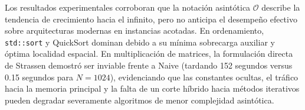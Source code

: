 Los resultados experimentales corroboran que la notación asintótica $\mathcal{O}$ describe la tendencia de crecimiento hacia el infinito, pero no anticipa el desempeño efectivo sobre arquitecturas modernas en instancias acotadas. En ordenamiento, \texttt{std::sort} y QuickSort dominan debido a su mínima sobrecarga auxiliar y óptima localidad espacial. En multiplicación de matrices, la formulación directa de Strassen demostró ser inviable frente a Naive (tardando 152 segundos versus 0.15 segundos para $N=1024$), evidenciando que las constantes ocultas, el tráfico hacia la memoria principal y la falta de un corte híbrido hacia métodos iterativos pueden degradar severamente algoritmos de menor complejidad asintótica.